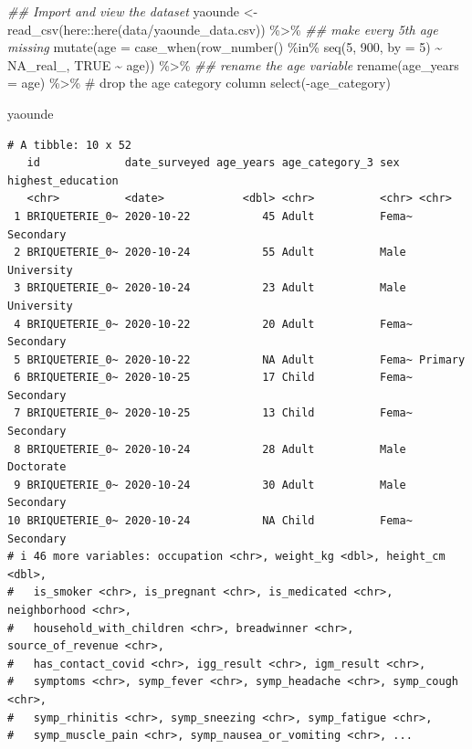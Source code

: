 \documentclass[
  letterpaper,
  DIV=11,
  numbers=noendperiod]{scrreprt}
\newenvironment{Shaded}{\begin{snugshade}}{\end{snugshade}}
\newcommand{\AttributeTok}[1]{\textcolor[rgb]{0.40,0.45,0.13}{#1}}
\newcommand{\CommentTok}[1]{\textcolor[rgb]{0.37,0.37,0.37}{#1}}
\newcommand{\ConstantTok}[1]{\textcolor[rgb]{0.56,0.35,0.01}{#1}}
\newcommand{\DecValTok}[1]{\textcolor[rgb]{0.68,0.00,0.00}{#1}}
\newcommand{\DocumentationTok}[1]{\textcolor[rgb]{0.37,0.37,0.37}{\textit{#1}}}
\newcommand{\FunctionTok}[1]{\textcolor[rgb]{0.28,0.35,0.67}{#1}}
\newcommand{\NormalTok}[1]{\textcolor[rgb]{0.00,0.23,0.31}{#1}}
\newcommand{\OtherTok}[1]{\textcolor[rgb]{0.00,0.23,0.31}{#1}}
\newcommand{\SpecialCharTok}[1]{\textcolor[rgb]{0.37,0.37,0.37}{#1}}
\newcommand{\StringTok}[1]{\textcolor[rgb]{0.13,0.47,0.30}{#1}}
\begin{document}
\begin{Shaded}
\begin{Highlighting}[]
\DocumentationTok{\#\# Import and view the dataset}
\NormalTok{yaounde }\OtherTok{\textless{}{-}} 
  \FunctionTok{read\_csv}\NormalTok{(here}\SpecialCharTok{::}\FunctionTok{here}\NormalTok{(}\StringTok{\textquotesingle{}data/yaounde\_data.csv\textquotesingle{}}\NormalTok{)) }\SpecialCharTok{\%\textgreater{}\%} 
  \DocumentationTok{\#\# make every 5th age missing}
  \FunctionTok{mutate}\NormalTok{(}\AttributeTok{age =} \FunctionTok{case\_when}\NormalTok{(}\FunctionTok{row\_number}\NormalTok{() }\SpecialCharTok{\%in\%} \FunctionTok{seq}\NormalTok{(}\DecValTok{5}\NormalTok{, }\DecValTok{900}\NormalTok{, }\AttributeTok{by =} \DecValTok{5}\NormalTok{) }\SpecialCharTok{\textasciitilde{}} \ConstantTok{NA\_real\_}\NormalTok{,}
                         \ConstantTok{TRUE} \SpecialCharTok{\textasciitilde{}}\NormalTok{ age)) }\SpecialCharTok{\%\textgreater{}\%} 
  \DocumentationTok{\#\# rename the age variable }
  \FunctionTok{rename}\NormalTok{(}\AttributeTok{age\_years =}\NormalTok{ age) }\SpecialCharTok{\%\textgreater{}\%}
  \CommentTok{\# drop the age category column}
  \FunctionTok{select}\NormalTok{(}\SpecialCharTok{{-}}\NormalTok{age\_category)}

\NormalTok{yaounde}
\end{Highlighting}
\end{Shaded}

\begin{verbatim}
# A tibble: 10 x 52
   id             date_surveyed age_years age_category_3 sex   highest_education
   <chr>          <date>            <dbl> <chr>          <chr> <chr>            
 1 BRIQUETERIE_0~ 2020-10-22           45 Adult          Fema~ Secondary        
 2 BRIQUETERIE_0~ 2020-10-24           55 Adult          Male  University       
 3 BRIQUETERIE_0~ 2020-10-24           23 Adult          Male  University       
 4 BRIQUETERIE_0~ 2020-10-22           20 Adult          Fema~ Secondary        
 5 BRIQUETERIE_0~ 2020-10-22           NA Adult          Fema~ Primary          
 6 BRIQUETERIE_0~ 2020-10-25           17 Child          Fema~ Secondary        
 7 BRIQUETERIE_0~ 2020-10-25           13 Child          Fema~ Secondary        
 8 BRIQUETERIE_0~ 2020-10-24           28 Adult          Male  Doctorate        
 9 BRIQUETERIE_0~ 2020-10-24           30 Adult          Male  Secondary        
10 BRIQUETERIE_0~ 2020-10-24           NA Child          Fema~ Secondary        
# i 46 more variables: occupation <chr>, weight_kg <dbl>, height_cm <dbl>,
#   is_smoker <chr>, is_pregnant <chr>, is_medicated <chr>, neighborhood <chr>,
#   household_with_children <chr>, breadwinner <chr>, source_of_revenue <chr>,
#   has_contact_covid <chr>, igg_result <chr>, igm_result <chr>,
#   symptoms <chr>, symp_fever <chr>, symp_headache <chr>, symp_cough <chr>,
#   symp_rhinitis <chr>, symp_sneezing <chr>, symp_fatigue <chr>,
#   symp_muscle_pain <chr>, symp_nausea_or_vomiting <chr>, ...
\end{verbatim}
\end{document}
